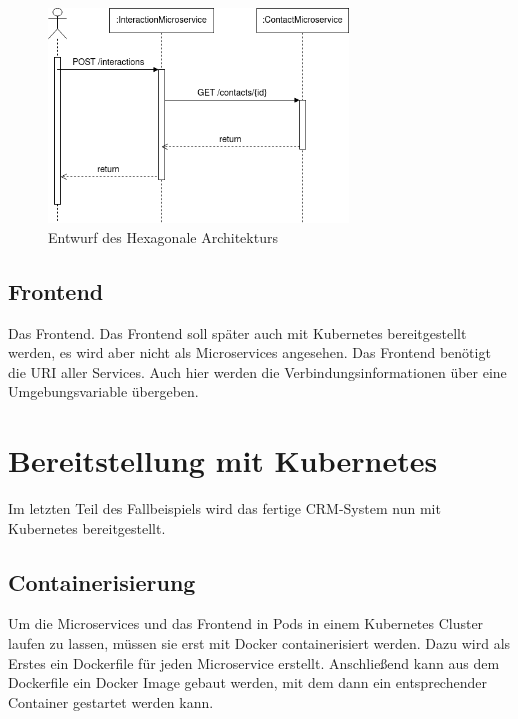 \begin{figure}[H] 
    \centering
    \includegraphics[width=0.71\textwidth]{figures/UMLSequenzdiagramm.png}
    \caption{Entwurf des \acp{Hexagonale Architektur}}
    \label{fig:CRMENTWURF}
\end{figure}

\subsection{Frontend}

Das Frontend. Das Frontend soll später auch mit Kubernetes bereitgestellt werden, es wird aber nicht als Microservices angesehen. Das Frontend benötigt die \ac{URI} aller Services. Auch hier werden die Verbindungsinformationen über eine Umgebungsvariable übergeben.

\clearpage
\section{Bereitstellung mit Kubernetes}

Im letzten Teil des Fallbeispiels wird das fertige CRM-System nun mit Kubernetes bereitgestellt.

\subsection{Containerisierung}

Um die Microservices und das Frontend in Pods in einem Kubernetes Cluster laufen zu lassen, müssen sie erst mit Docker containerisiert werden. Dazu wird als Erstes ein Dockerfile für jeden Microservice erstellt. Anschließend kann aus dem Dockerfile ein Docker Image gebaut werden, mit dem dann ein entsprechender Container gestartet werden kann. \\
\\

